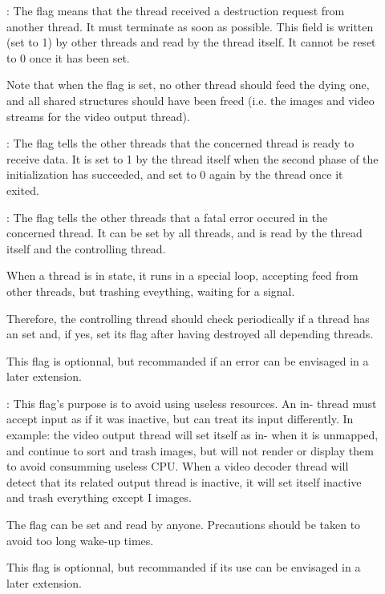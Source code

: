 \begin{description}
\item[]:
The  flag means that the thread received a destruction request 
from  another thread. It must terminate as soon as possible. This field is 
written (set to 1) by other threads and read by the thread itself. It cannot 
be reset to 0 once it has been set.

Note that when the  flag is set, no other thread should feed the 
dying one, and all shared structures should have been freed (i.e. the images 
and video streams for the video output thread).

\item[]:
The  flag tells the other threads that the concerned thread is 
ready to receive data. It is set to 1 by the thread itself when the second 
phase of the initialization has succeeded, and set to 0 again by the thread 
once it exited.

\item[]:
The  flag tells the other threads that a fatal error occured in
the concerned thread. It can be set by all threads, and is read by the thread
itself and the controlling thread.

When a thread is in  state, it runs in a special loop, 
accepting feed from other threads, but trashing eveything, waiting for a 
 signal.

Therefore, the controlling thread should check periodically if a thread has an
 set and, if yes, set its  flag after having 
destroyed all depending threads.

This flag is optionnal, but recommanded if an error can be envisaged in a later
extension.

\item[]:
This flag's purpose is to avoid using useless resources. An in-
thread must accept input as if it was inactive, but can treat its input 
differently.
In example: the video output thread will set itself as in- 
when it is unmapped, and continue to sort and trash images, but will not 
render or display them to avoid consumming useless CPU. When a video decoder 
thread will detect that its related output thread is inactive, it will set 
itself inactive and trash everything except I images.

The  flag can be set and read by anyone. Precautions should be
taken to avoid too long wake-up times.

This flag is optionnal, but recommanded if its use can be envisaged in a later
extension.
\end{description}

